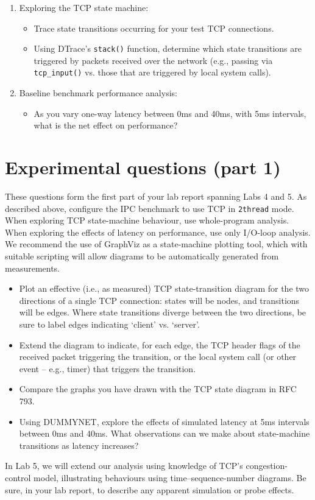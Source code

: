 \documentclass[a4paper,10pt]{article}
\begin{document}
\begin{enumerate}
  \item Exploring the TCP state machine:
  \begin{itemize}
    \item Trace state transitions occurring for your test TCP connections.
    \item Using DTrace's \texttt{stack()} function, determine which state
      transitions are triggered by packets received over the network (e.g.,
      passing via \texttt{tcp\_input()} vs. those that are triggered by local
      system calls).
  \end{itemize}
  \item Baseline benchmark performance analysis:
  \begin{itemize}
    \item As you vary one-way latency between 0ms and 40ms, with 5ms
      intervals, what is the net effect on performance?
  \end{itemize}
\end{enumerate}

\section*{Experimental questions (part 1)}

These questions form the first part of your lab report spanning Labs 4 and 5.
As described above, configure the IPC benchmark to use TCP in \texttt{2thread}
mode.
When exploring TCP state-machine behaviour, use whole-program analysis.
When exploring the effects of latency on performance, use only I/O-loop
analysis.
We recommend the use of GraphViz as a state-machine plotting tool, which with
suitable scripting will allow diagrams to be automatically generated from
measurements.

\begin{itemize}
  \item Plot an effective (i.e., as measured) TCP state-transition diagram for
    the two directions of a single TCP connection: states will be nodes, and
    transitions will be edges.
    Where state transitions diverge between the two directions, be sure to
    label edges indicating `client' vs. `server'.

  \item Extend the diagram to indicate, for each edge, the TCP header flags
    of the received packet triggering the transition, or the local system call
    (or other event -- e.g., timer) that triggers the transition.

  \item Compare the graphs you have drawn with the TCP state diagram in RFC
    793.

  \item Using DUMMYNET, explore the effects of simulated latency at 5ms
    intervals between 0ms and 40ms.
    What observations can we make about state-machine transitions as latency
    increases?
\end{itemize}

\noindent
In Lab 5, we will extend our analysis using knowledge of TCP's
congestion-control model, illustrating behaviours using time--sequence-number
diagrams.
Be sure, in your lab report, to describe any apparent simulation or probe
effects.
\end{document}
